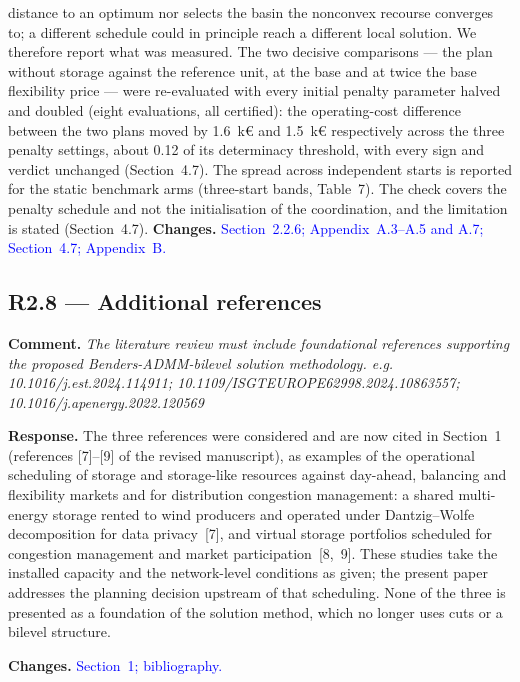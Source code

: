 \documentclass[11pt]{article}
\newcommand{\rcomment}[1]{\par\medskip\noindent\textbf{Comment.} \textit{#1}\par\smallskip}
\newcommand{\rresponse}[1]{\noindent\textbf{Response.} #1\par\smallskip}
\newcommand{\rchanges}[1]{\noindent\textbf{Changes.} \textcolor{blue}{#1}\par\medskip}
\begin{document}
{distance to an optimum nor selects the basin the nonconvex recourse converges to; a different
schedule could in principle reach a different local solution. We therefore report what was measured. The two decisive comparisons --- the plan without storage against the reference unit, at the base and at twice the base flexibility price --- were re-evaluated with every initial penalty parameter halved and doubled (eight evaluations, all certified): the operating-cost difference between the two plans moved by 1.6~k\euro{} and 1.5~k\euro{} respectively across the three penalty settings, about 0.12 of its determinacy threshold, with every sign and verdict unchanged (Section~4.7). The spread across independent starts is reported for the static benchmark arms (three-start bands, Table~7). The check covers the penalty schedule and not the initialisation of the coordination, and the limitation is stated (Section~4.7).}
\rchanges{Section~2.2.6; Appendix~A.3--A.5 and A.7; Section~4.7; Appendix~B.}

\subsection*{R2.8 --- Additional references}

\rcomment{
    The literature review must include foundational references supporting the proposed Benders-ADMM-bilevel solution methodology. e.g. 10.1016/j.est.2024.114911; 10.1109/ISGTEUROPE62998.2024.10863557; 10.1016/j.apenergy.2022.120569
}

\rresponse{
    The three references were considered and are now cited in Section~1 (references [7]--[9] of the revised manuscript), as examples of the operational scheduling of storage and storage-like resources against day-ahead, balancing and flexibility markets and for distribution congestion management: a shared multi-energy storage rented to wind producers and operated under Dantzig--Wolfe decomposition for data privacy~[7], and virtual storage portfolios scheduled for congestion management and market participation~[8,~9]. These studies take the installed capacity and the network-level conditions as given; the present paper addresses the planning decision upstream of that scheduling. None of the three is presented as a foundation of the solution method, which no longer uses cuts or a bilevel structure.
}

\rchanges{Section~1; bibliography.}
\end{document}
